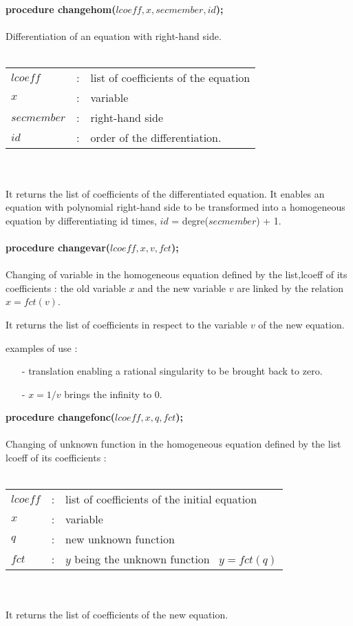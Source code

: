 \documentclass[a4paper]{article}
\begin{document}
{\bf procedure changehom($lcoeff,x,secmember,id$);} \\
\ \\
Differentiation of an equation with right-hand side. \\
\ \\
\begin{tabular}{lcl}
$lcoeff$ & : & list of coefficients of the equation \\
$x$ & : & variable \\
$secmember$ & : & right-hand side \\
$id$ & : & order of the differentiation. \\
\end{tabular} \\
\ \\
It returns the list of coefficients of the differentiated equation.
It enables an equation with polynomial right-hand side to be transformed
into a homogeneous equation by differentiating id times,
$id$ = degre($secmember$) + 1. \\
\ \\
{\bf procedure changevar($lcoeff,x,v,fct$);} \\
\ \\
Changing of variable in the homogeneous equation defined by the list,lcoeff
of its coefficients : the old variable $x$ and the new variable $v$ are linked
by the relation $x = fct(v)$. \par

It returns the list of coefficients in respect to the variable $v$ of the new
equation. \par

examples of use : \par

\begin{itemize}
\item[-] translation enabling a rational singularity to be brought back to zero.
\item[-] $x = 1/v$ brings the infinity to 0.
\end{itemize}

{\bf procedure changefonc($lcoeff,x,q,fct$);} \\
\ \\
Changing of unknown function in the homogeneous equation defined by the
list lcoeff of its coefficients : \\
\ \\
\begin{tabular}{lcl}
$lcoeff$ & : & list of coefficients of the initial equation \\
$x$      & : & variable \\
$q$ & : & new unknown function \\
$fct$ & : & $y$ being the unknown function~ $y = fct(q)$ \\
\end{tabular} \\
\ \\
It returns the list of coefficients of the new equation. \par
\end{document}
